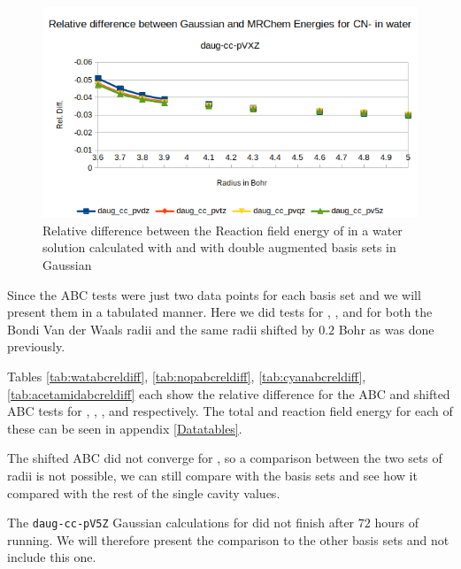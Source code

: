 \documentclass[../master_thesis.tex]{subfiles}
\begin{document}
\begin{figure}[h!]
  \centering
    \includegraphics[width=\linewidth]{img/cyandaugreldiff.png}
  \caption{Relative difference between the Reaction field energy of  in a water solution calculated with \mrchem
  and with double augmented basis sets in Gaussian}
  \label{fig:cyanreldiffdaug}
\end{figure}


Since the \ac{ABC} tests were just two data points for each basis set and \newline\mrchem
we will present them in a tabulated manner. Here we did tests for , ,  and 
for both the Bondi Van der Waals radii and the same radii shifted by $0.2$ Bohr as was done previously.

Tables \ref{tab:watabcreldiff}, \ref{tab:nopabcreldiff}, \ref{tab:cyanabcreldiff}, \ref{tab:acetamidabcreldiff}
each show the relative difference for the \ac{ABC} and shifted \ac{ABC} tests
for , , , and  respectively. The
total and  reaction field energy for each of these can be seen in appendix \ref{Datatables}.

The shifted \ac{ABC} did not converge for , so a comparison between the two sets
of radii is not possible, we can still compare with the basis sets and see how it compared with
the rest of the single cavity values.

The \verb!daug-cc-pV5Z! Gaussian calculations for  did not finish
after $72$ hours of running. We will therefore present the comparison to the other
basis sets and not include this one.
\end{document}
